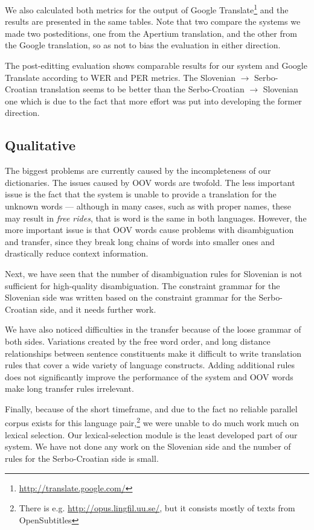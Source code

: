We also calculated both metrics for the output of Google Translate\footnote{\url{http://translate.google.com/}} 
and the results are presented in the same tables. Note that two compare the systems
we made two posteditions, one from the Apertium translation, and the other 
from the Google translation, so as not to bias the evaluation in either direction.

The post-editting evaluation shows comparable results for our system
and Google Translate according to WER and PER metrics.  The Slovenian
$\rightarrow$ Serbo-Croatian translation seems to be better than the
Serbo-Croatian $\rightarrow$ Slovenian one which is due to the fact
that more effort was put into developing the former direction.



\subsection{Qualitative}
The biggest problems are currently caused by the incompleteness of our dictionaries.
The issues caused by OOV words are twofold.
The less important issue is the fact that the system is unable to provide a translation for the unknown words ---
although in many cases, such as with proper names, these may result in \emph{free rides}, that is word
is the same in both languages.
However, the more important issue is that OOV words cause problems with disambiguation and transfer, since they
break long chains of words into smaller ones and drastically reduce context information. 

Next, we have seen that the number of disambiguation rules for Slovenian is not sufficient for high-quality disambiguation. 
The constraint grammar for the Slovenian side was written based on the constraint grammar for the Serbo-Croatian side,
and it needs further work.

We have also noticed difficulties in the transfer because of the loose
grammar of both sides. Variations created by the free word order, and
long distance relationships between sentence constituents make it
difficult to write translation rules that cover a wide variety of
language constructs. Adding additional rules does not significantly
improve the performance of the system and OOV words make long transfer
rules irrelevant.

Finally, because of the short timeframe, and due to the fact no
reliable parallel corpus exists for this language pair,\footnote{There
is e.g. \url{http://opus.lingfil.uu.se/}, but it consists mostly of
texts from OpenSubtitles} we were unable to do much work much on lexical selection.
Our lexical-selection module is the least developed part of our
system. We have not done any work on the Slovenian side and the number
of rules for the Serbo-Croatian side is small.
